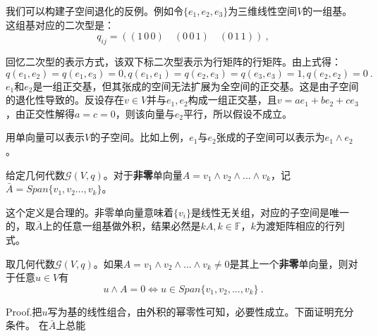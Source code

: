 我们可以构建子空间退化的反例。例如令$\{e_1,e_2,e_3\}$为三维线性空间$V$的一组基。这组基对应的二次型是：
\begin{equation}
q_{ij}=((1\,0\,0)\quad (0\,0\,1)\quad(0\,1\,1))~,
\end{equation}

回忆二次型的表示方式，该双下标二次型表示为行矩阵的行矩阵。由上式得：$$q(e_1,e_2)=q(e_1,e_3)=0,q(e_1,e_1)=q(e_2,e_3)=q(e_3,e_3)=1,q(e_2,e_2)=0~.$$
$e_1$和$e_2$是一组正交基，但其张成的空间无法扩展为全空间的正交基。这是由子空间的退化性导致的。反设存在$v\in V$并与$e_1,e_2$构成一组正交基，且$v=ae_1+be_2+ce_3$，由正交性解得$a=c=0$，则该向量与$e_2$平行，所以假设不成立。

用单向量可以表示$V$的子空间。比如上例，$e_1$与$e_2$张成的子空间可以表示为$e_1\wedge e_2$。
\begin{definition}{}
给定几何代数$\mathcal G(V,q)$。对于\textbf{非零}单向量$A=v_1\wedge v_2\wedge ...\wedge  v_k$，记$\bar{A}=Span\{v_1,v_2\dots,v_k\}$。
\end{definition}
这个定义是合理的。非零单向量意味着$\{v_i\}$是线性无关组，对应的子空间是唯一的，取$\bar A$上的任意一组基做外积，结果必然是$kA,k\in\mathbb F$，$k$为渡矩阵相应的行列式。
\begin{theorem}{}
取几何代数$\mathcal G(V,q)$。如果$A=v_1\wedge v_2\wedge...\wedge v_k \neq 0 $是其上一个\textbf{非零}单向量，则对于任意$u\in V$有
\begin{equation}
u\wedge A=0\Longleftrightarrow  u\in Span\{v_1,v_2,...,v_k\}~.
\end{equation}
\end{theorem}
Proof.把$u$写为基的线性组合，由外积的幂零性可知，必要性成立。下面证明充分条件。
在$\bar A$上总能

